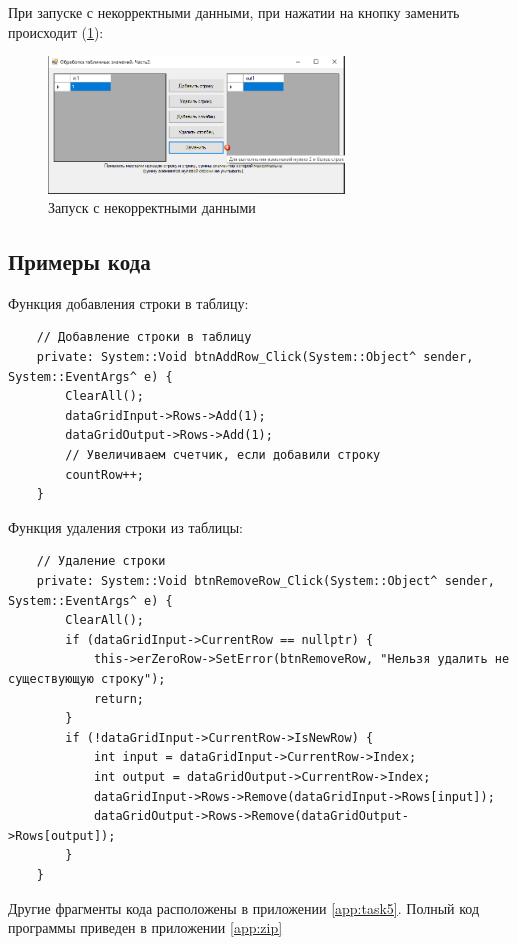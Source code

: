 При запуске с некорректными данными, при нажатии на кнопку заменить происходит  (\ref{fig:BadInputNotIntForm5}):

\begin{figure}[!h]
    \centering
    \includegraphics[width = 0.7\textwidth]{images/Task5/Try1RowChange.png}
    \caption{Запуск с некорректными данными}
    \label{fig:BadInputNotIntForm5}
\end{figure}

\subsection{Примеры кода}

Функция добавления строки в таблицу:

\begin{verbatim}
	// Добавление строки в таблицу
	private: System::Void btnAddRow_Click(System::Object^ sender, System::EventArgs^ e) {
		ClearAll();
		dataGridInput->Rows->Add(1);
		dataGridOutput->Rows->Add(1);
		// Увеличиваем счетчик, если добавили строку
		countRow++;
	}
\end{verbatim}

Функция удаления строки из таблицы:

\begin{verbatim}
	// Удаление строки
	private: System::Void btnRemoveRow_Click(System::Object^ sender, System::EventArgs^ e) {
		ClearAll();
		if (dataGridInput->CurrentRow == nullptr) {
			this->erZeroRow->SetError(btnRemoveRow, "Нельзя удалить не существующую строку");
			return;
		}
		if (!dataGridInput->CurrentRow->IsNewRow) {
			int input = dataGridInput->CurrentRow->Index;
			int output = dataGridOutput->CurrentRow->Index;
			dataGridInput->Rows->Remove(dataGridInput->Rows[input]);
			dataGridOutput->Rows->Remove(dataGridOutput->Rows[output]);
		}
	}
\end{verbatim}

Другие фрагменты кода расположены в приложении \ref{app:task5}. Полный код программы приведен в приложении \ref{app:zip}
